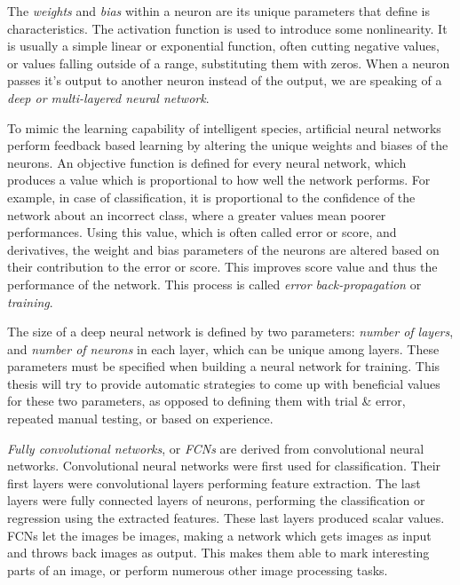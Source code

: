 \documentclass[12pt]{report}
\begin{document}
The \textit{weights} and \textit{bias} within a neuron are its unique parameters that define is characteristics. The activation function is used to introduce some nonlinearity. It is usually a simple linear or exponential function, often cutting negative values, or values falling outside of a range, substituting them with zeros. When a neuron passes it's output to another neuron instead of the output, we are speaking of a \textit{deep or multi-layered neural network}.\par

To mimic the learning capability of intelligent species, artificial neural networks perform feedback based learning by altering the unique weights and biases of the neurons. An objective function is defined for every neural network, which produces a value which is proportional to how well the network performs. For example, in case of classification, it is proportional to the confidence of the network about an incorrect class, where a greater values mean poorer performances. Using this value, which is often called error or score, and derivatives, the weight and bias parameters of the neurons are altered based on their contribution to the error or score. This improves score value and thus the performance of the network. This process is called \textit{error back-propagation} or \textit{training}.\par

The size of a deep neural network is defined by two parameters: \textit{number of layers}, and \textit{number of neurons} in each layer, which can be unique among layers. These parameters must be specified when building a neural network for training. This thesis will try to provide automatic strategies to come up with beneficial values for these two parameters, as opposed to defining them with trial \& error, repeated manual testing, or based on experience.\par

\textit{Fully convolutional networks}, or \textit{FCNs} are derived from convolutional neural networks. Convolutional neural networks were first used for classification. Their first layers were convolutional layers performing feature extraction. The last layers were fully connected layers of neurons, performing the classification or regression using the extracted features. These last layers produced scalar values. FCNs let the images be images, making a network which gets images as input and throws back images as output. This makes them able to mark interesting parts of an image, or perform numerous other image processing tasks.\par
\end{document}
